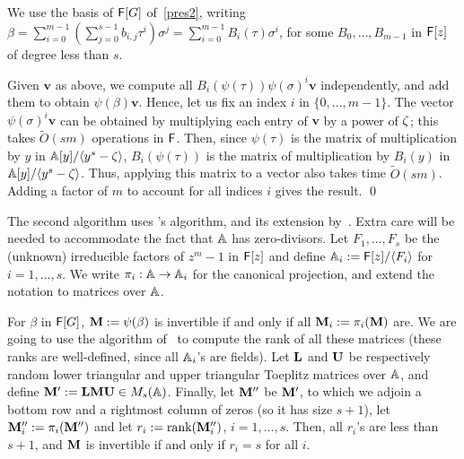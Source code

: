 \smallskipback
{}
  We use the basis of  ${\mathsf{F}}[G]$ of~\eqref{pres2}, writing $\beta =
  \sum_{i = 0}^{m-1} \left( \sum_{j = 0}^{s-1}  b_{i,j} \tau^i
  \right) \sigma^j = \sum_{i
    = 0}^{m-1} B_i(\tau) \sigma^i$, for some $B_0,\dots,B_{m-1}$ in
  ${\mathsf{F}}[z]$ of degree less than $s$.

 Given $\boldsymbol{v}$ as above, we compute all $B_i(\psi(\tau))
 \psi(\sigma)^i \boldsymbol{v}$ independently, and add them to obtain
 $\psi(\beta) \boldsymbol{v}$. Hence, let us fix an index $i$ in
 $\{0,\dots,m-1\}$.
 The vector $\psi(\sigma)^i \boldsymbol{v}$ can be obtained by
 multiplying each entry of $\boldsymbol{v}$ by a power of $\zeta$;
 this takes $\tilde{O}(sm)$ operations in ${\mathsf{F}}$. Then, since
 $\psi(\tau)$ is the matrix of multiplication by $y$ in $\mathbb{A}[y]/\langle
 y^s-\zeta\rangle$, $B_i(\psi(\tau))$ is the matrix of multiplication
 by $B_i(y)$ in $\mathbb{A}[y]/\langle y^s-\zeta\rangle$. Thus, applying this
 matrix to a vector also takes time $\tilde{O}(sm)$.
 Adding a factor of $m$ to account for all indices $i$ gives
 the result.
\qed





  The second algorithm uses \citeauthor{Wiedemann86}'s
  \citeyear{Wiedemann86} algorithm,
  and its extension by~. Extra care will be needed to
  accommodate the fact that $\mathbb{A}$ has zero-divisors. Let
  $F_1,\dots,F_s$ be the (unknown) irreducible factors of $z^m-1$ in
  ${\mathsf{F}}[z]$ and define $\mathbb{A}_i := {\mathsf{F}}[z]/\langle F_i \rangle$ for
  $i=1,\dots,s$. We write $\pi_i: \mathbb{A} \to\mathbb{A}_i$ for the canonical
  projection, and extend the notation to matrices over $\mathbb{A}$.

  For $\beta$ in ${\mathsf{F}}[G]$, $\mat M:=\psi(\beta)$ is invertible if and only
  if all $\mat M_i := \pi_i(\mat M)$ are. We are going to use the algorithm
  of~\cite[Section~4]{KaSa91} to compute the rank of all these matrices
  (these ranks are well-defined, since all $\mathbb{A}_i$'s are fields).  Let
  $\mat L$ and $\mat U$ be respectively random lower triangular and upper
  triangular Toeplitz matrices over $\mathbb{A}$, and define
  $\mat M':=\mat L \mat M \mat U \in M_s(\A)$. Finally, let $\mat M''$ be
  $\mat M'$, to which we adjoin a bottom row and a rightmost column of
  zeros (so it has size $s+1$), let $\mat M''_i :=\pi_i(\mat M'')$ and let
  $r_i :=\text{rank}(\mat M''_i)$, $i=1,\dots,s$. Then, all $r_i$'s are
  less than $s+1$, and $\mat M$ is invertible if and only if $r_i=s$ for
  all $i$.

